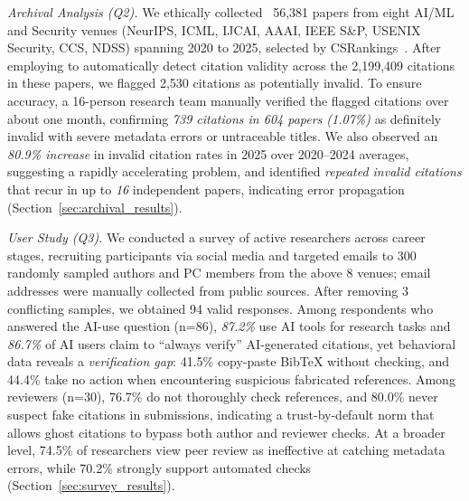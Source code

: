 \textit{Archival Analysis (Q2).}
We ethically collected~\cite{bailey2012menlo} 56,381 papers from eight AI/ML and Security venues (NeurIPS, ICML, IJCAI, AAAI, IEEE S\&P, USENIX Security, CCS, NDSS) spanning 2020 to 2025, selected by CSRankings~\cite{csrankings}. After employing \citeb to automatically detect citation validity across the 2,199,409 citations in these papers, we flagged 2,530 citations as potentially invalid. To ensure accuracy, a 16-person research team manually verified the flagged citations over about one month, confirming \textit{739 citations in 604 papers (1.07\%)} as definitely invalid with severe metadata errors or untraceable titles. We also observed an \textit{80.9\% increase} in invalid citation rates in 2025 over 2020--2024 averages, suggesting a rapidly accelerating problem, and identified \textit{repeated invalid citations} that recur in up to \textit{16} independent papers, indicating error propagation (Section~\ref{sec:archival_results}).

\textit{User Study (Q3).}
We conducted a survey of active researchers across career stages, recruiting participants via social media and targeted emails to 300 randomly sampled authors and PC members from the above 8 venues; email addresses were manually collected from public sources. After removing 3 conflicting samples, we obtained 94 valid responses.
Among respondents who answered the AI-use question (n=86), \textit{87.2\%} use AI tools for research tasks and \textit{86.7\%} of AI users claim to ``always verify'' AI-generated citations, yet behavioral data reveals a \textit{verification gap}: 41.5\% copy-paste BibTeX without checking, and 44.4\% take no action when encountering suspicious fabricated references. Among reviewers (n=30), 76.7\% do not thoroughly check references, and 80.0\% never suspect fake citations in submissions, indicating a trust-by-default norm that allows ghost citations to bypass both author and reviewer checks.
At a broader level, 74.5\% of researchers view peer review as ineffective at catching metadata errors, while 70.2\% strongly support automated checks (Section~\ref{sec:survey_results}).

